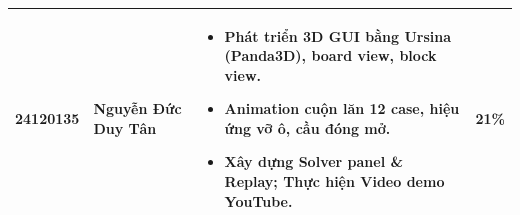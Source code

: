 \begin{table}[H]
\begin{tabularx}{\textwidth}{|p{2cm}|p{4cm}|X|c|}
        24120135 & Nguyễn Đức Duy Tân &
        \vspace{-0.5\baselineskip}
        \begin{itemize}[itemsep=0pt, topsep=0pt, partopsep=0pt, parsep=0pt]
            \item Phát triển 3D GUI bằng Ursina (Panda3D), board view, block view.
            \item Animation cuộn lăn 12 case, hiệu ứng vỡ ô, cầu đóng mở.
            \item Xây dựng Solver panel \& Replay; Thực hiện Video demo YouTube.
        \end{itemize} & 21\% \\ \hline
    \end{tabularx}
\end{table}
